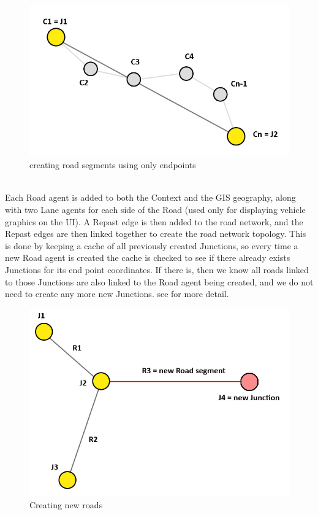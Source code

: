 \documentclass[11pt]{article}
\begin{document}
\begin{figure}[H]
\begin{center}
\includegraphics[scale=0.4]{creating_road_segments_from_shapefile}
\caption{creating road segments using only endpoints}
\end{center}
\end{figure}

\\
Each Road agent is added to both the Context and the GIS geography, along with two Lane agents for each side of the Road (used only for displaying vehicle graphics on the UI). A Repast edge is then added to the road network, and the Repast edges are then linked together to create the road network topology. This is done by keeping a cache of all previously created Junctions, so every time a new Road agent is created the cache is checked to see if there already exists Junctions for its end point coordinates. If there is, then we know all roads linked to those Junctions are also linked to the Road agent being created, and we do not need to create any more new Junctions. see \cite{3c} for more detail. 
\\

\begin{figure}[H]
\begin{center}
\includegraphics[scale=0.3]{creating_new_roads}
\caption{Creating new roads}
\end{center}
\end{figure}
\end{document}
